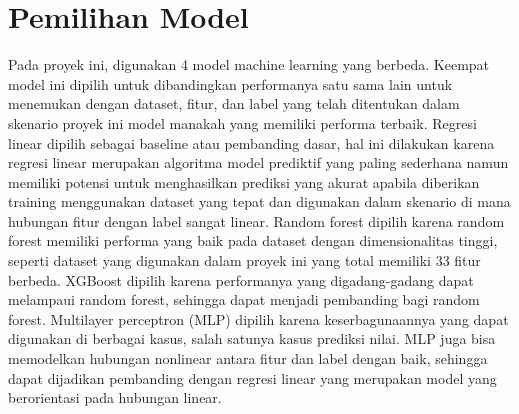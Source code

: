 \section{Pemilihan Model}
Pada proyek ini, digunakan 4 model machine learning yang berbeda. Keempat model ini dipilih untuk dibandingkan performanya satu sama lain untuk menemukan dengan dataset, fitur, dan label yang telah ditentukan dalam skenario proyek ini model manakah yang memiliki performa terbaik. Regresi linear dipilih sebagai baseline atau pembanding dasar, hal ini dilakukan karena regresi linear merupakan algoritma model prediktif yang paling sederhana namun memiliki potensi untuk menghasilkan prediksi yang akurat apabila diberikan training menggunakan dataset yang tepat dan digunakan dalam skenario di mana hubungan fitur dengan label sangat linear. Random forest dipilih karena random forest memiliki performa yang baik pada dataset dengan dimensionalitas tinggi, seperti dataset yang digunakan dalam proyek ini yang total memiliki 33 fitur berbeda. XGBoost dipilih karena performanya yang digadang-gadang dapat melampaui random forest, sehingga dapat menjadi pembanding bagi random forest. Multilayer perceptron (MLP) dipilih karena keserbagunaannya yang dapat digunakan di berbagai kasus, salah satunya kasus prediksi nilai. MLP juga bisa memodelkan hubungan nonlinear antara fitur dan label dengan baik, sehingga dapat dijadikan pembanding dengan regresi linear yang merupakan model yang berorientasi pada hubungan linear.